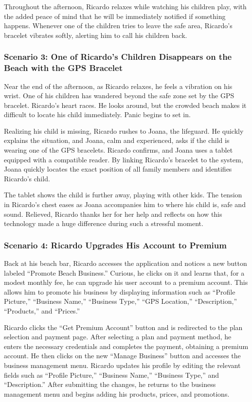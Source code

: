 Throughout the afternoon, Ricardo relaxes while watching his children play, with the added peace of mind that he will be immediately notified if something happens. Whenever one of the children tries to leave the safe area, Ricardo’s bracelet vibrates softly, alerting him to call his children back.

\subsubsection{\textbf{Scenario 3:} One of Ricardo’s Children Disappears on the Beach with the GPS Bracelet}
Near the end of the afternoon, as Ricardo relaxes, he feels a vibration on his wrist. One of his children has wandered beyond the safe zone set by the GPS bracelet. Ricardo’s heart races. He looks around, but the crowded beach makes it difficult to locate his child immediately. Panic begins to set in.

Realizing his child is missing, Ricardo rushes to Joana, the lifeguard. He quickly explains the situation, and Joana, calm and experienced, asks if the child is wearing one of the GPS bracelets. Ricardo confirms, and Joana uses a tablet equipped with a compatible reader. By linking Ricardo’s bracelet to the system, Joana quickly locates the exact position of all family members and identifies Ricardo’s child.

The tablet shows the child is further away, playing with other kids. The tension in Ricardo’s chest eases as Joana accompanies him to where his child is, safe and sound. Relieved, Ricardo thanks her for her help and reflects on how this technology made a huge difference during such a stressful moment.

\subsubsection{\textbf{Scenario 4:} Ricardo Upgrades His Account to Premium}
Back at his beach bar, Ricardo accesses the application and notices a new button labeled ``Promote Beach Business.'' Curious, he clicks on it and learns that, for a modest monthly fee, he can upgrade his user account to a premium account. This allows him to promote his business by displaying information such as ``Profile Picture,'' ``Business Name,'' ``Business Type,'' ``GPS Location,'' ``Description,'' ``Products,'' and ``Prices.''

Ricardo clicks the ``Get Premium Account'' button and is redirected to the plan selection and payment page. After selecting a plan and payment method, he enters the necessary credentials and completes the payment, obtaining a premium account. He then clicks on the new ``Manage Business'' button and accesses the business management menu. Ricardo updates his profile by editing the relevant fields such as ``Profile Picture,'' ``Business Name,'' ``Business Type,'' and ``Description.'' After submitting the changes, he returns to the business management menu and begins adding his products, prices, and promotions.

